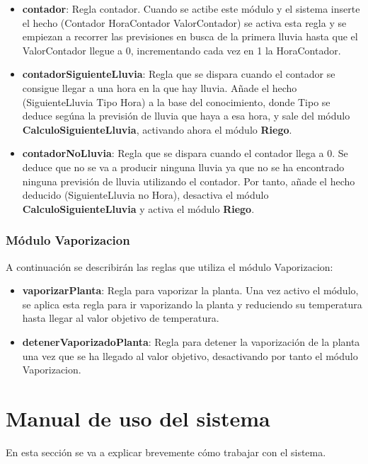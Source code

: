 \documentclass[11pt,a4paper]{article}
\begin{document}
\begin{itemize}
	\item \textbf{contador}: Regla contador. Cuando se actibe este módulo y el sistema inserte el hecho (Contador HoraContador
	ValorContador) se activa esta regla y se empiezan a recorrer las previsiones en busca de la primera lluvia hasta que el
	ValorContador llegue a 0, incrementando cada vez en 1 la HoraContador.
	\item \textbf{contadorSiguienteLluvia}: Regla que se dispara cuando el contador se consigue llegar a una hora en la que
	hay lluvia. Añade el hecho (SiguienteLluvia Tipo Hora) a la base del conocimiento, donde Tipo se deduce segúna la previsión de
	lluvia que haya a esa hora,  y sale del módulo \textbf{CalculoSiguienteLluvia}, activando ahora el módulo \textbf{Riego}.
	\item \textbf{contadorNoLluvia}: Regla que se dispara cuando el contador llega a 0. Se deduce que no se va a producir ninguna
	lluvia ya que no se ha encontrado ninguna previsión de lluvia utilizando el contador. Por tanto, añade el hecho deducido
	(SiguienteLluvia no Hora), desactiva el módulo \textbf{CalculoSiguienteLluvia} y activa el módulo \textbf{Riego}.
\end{itemize}

\subsubsection{Módulo Vaporizacion}

A continuación se describirán las reglas que utiliza el módulo Vaporizacion:

\begin{itemize}
	\item \textbf{vaporizarPlanta}: Regla para vaporizar la planta. Una vez activo el módulo, se aplica esta regla para ir
	vaporizando la planta y reduciendo su temperatura hasta llegar al valor objetivo de temperatura.
	\item \textbf{detenerVaporizadoPlanta}: Regla para detener la vaporización de la planta una vez que se ha llegado al valor
	objetivo, desactivando por tanto el módulo Vaporizacion.
\end{itemize}

\newpage

\section{Manual de uso del sistema}

En esta sección se va a explicar brevemente cómo trabajar con el sistema.
\end{document}
